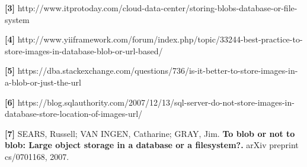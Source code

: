 \documentclass[12pt,a4paper]{article}
\begin{document}
\noindent \textbf{[3]} {http://www.itprotoday.com/cloud-data-center/storing-blobs-database-or-file-system}\\\vspace{0.2cm}

\noindent \textbf{[4]} {http://www.yiiframework.com/forum/index.php/topic/33244-best-practice-to-store-images-in-database-blob-or-url-based/}\\\vspace{0.2cm}

\noindent \textbf{[5]} {https://dba.stackexchange.com/questions/736/is-it-better-to-store-images-in-a-blob-or-just-the-url}\\\vspace{0.2cm}

\noindent \textbf{[6]} {https://blog.sqlauthority.com/2007/12/13/sql-server-do-not-store-images-in-database-store-location-of-images-url/}\\\vspace{0.2cm}

\noindent \textbf{[7]} SEARS, Russell; VAN INGEN, Catharine; GRAY, Jim. \textbf{To blob or not to blob: Large object storage in a database or a filesystem?.} arXiv preprint cs/0701168, 2007.
\end{document}
